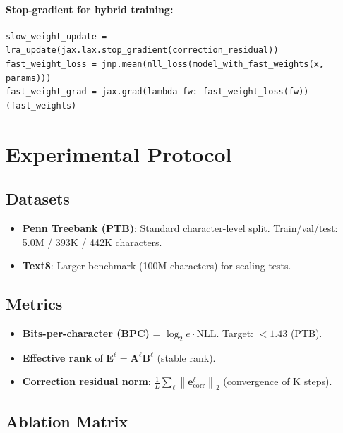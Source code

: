 \documentclass[11pt]{article}
\theoremstyle{definition}
\newcommand{\ve}{\mathbf{e}}
\newcommand{\E}{\mathbf{E}}
\newcommand{\A}{\mathbf{A}}
\newcommand{\B}{\mathbf{B}}
\newcommand{\norm}[1]{\left\|#1\right\|}
\begin{document}
\paragraph{Stop-gradient for hybrid training:}
\begin{verbatim}
slow_weight_update = lra_update(jax.lax.stop_gradient(correction_residual))
fast_weight_loss = jnp.mean(nll_loss(model_with_fast_weights(x, params)))
fast_weight_grad = jax.grad(lambda fw: fast_weight_loss(fw))(fast_weights)
\end{verbatim}

\section{Experimental Protocol}

\subsection{Datasets}
\begin{itemize}
  \item \textbf{Penn Treebank (PTB)}: Standard character-level split.
    Train/val/test: 5.0M / 393K / 442K characters.
  \item \textbf{Text8}: Larger benchmark (100M characters) for scaling tests.
\end{itemize}

\subsection{Metrics}
\begin{itemize}
  \item \textbf{Bits-per-character (BPC)} = $\log_2 e \cdot \mathrm{NLL}$. Target: $< 1.43$ (PTB).
  \item \textbf{Effective rank} of $\E^\ell = \A^\ell \B^\ell$ (stable rank).
  \item \textbf{Correction residual norm}: $\frac{1}{L}\sum_\ell \norm{\ve^\ell_\text{corr}}_2$ (convergence of K steps).
\end{itemize}

\subsection{Ablation Matrix}
\end{document}
